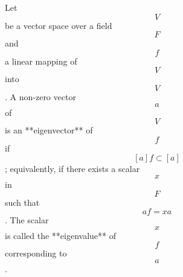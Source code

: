 Let $$V$$ be a vector space over a field $$F$$ and $$f$$ a linear mapping of $$V$$ into $$V$$. A non-zero vector $$a$$ of $$V$$ is an **eigenvector** of $$f$$ if $$[a]f \subset [a]$$; equivalently, if there exists a scalar $$x$$ in $$F$$ such that $$af = xa$$. The scalar $$x$$ is called the **eigenvalue** of $$f$$ corresponding to $$a$$.
